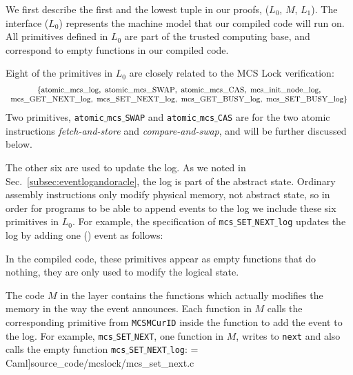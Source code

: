 We first describe the first and the lowest tuple in our proofs, ($L_0$, $M$, $L_1$).
The interface ($L_0$) represents the machine model that our compiled code will run on.
All primitives defined in $L_0$ are part of the trusted computing base, and correspond to empty functions in our compiled code.

Eight of the primitives in $L_0$  are closely related to the MCS Lock verification:
$$
\begin{small}
\begin{array}{c}
\{\mathrm{atomic\_mcs\_log},\ \mathrm{atomic\_mcs\_SWAP},\ \mathrm{atomic\_mcs\_CAS},\ \mathrm{mcs\_init\_node\_log},\\
\mathrm{mcs\_GET\_NEXT\_log},\ \mathrm{mcs\_SET\_NEXT\_log},\ \mathrm{mcs\_GET\_BUSY\_log},\ \mathrm{mcs\_SET\_BUSY\_log}\} \\
\end{array}
\end{small}
$$
Two primitives, \texttt{atomic$\_$mcs$\_$SWAP} and \texttt{atomic$\_$mcs$\_$CAS} are for the two atomic instructions {\em fetch-and-store} and {\em compare-and-swap}, and will be further discussed below.

The other six are used to update the log.  As we noted in
Sec.~\ref{subsec:eventlogandoracle}, the log is part of the abstract
state. Ordinary assembly instructions only modify physical memory, not
abstract state, so in order for programs to be able to append events to
the log we include these six primitives in $L_0$. 
For example, the specification of \texttt{mcs$\_$SET$\_$NEXT$\_$log} updates the log by adding one () event as follows:
 
In the compiled code, these primitives appear as empty functions that do nothing, they are only used to modify the logical state.


The code $M$ in the layer contains the 
functions which actually modifies the memory in the way the event announces.
Each function in $M$ calls the corresponding primitive from
\texttt{MCSMCurID} inside the function to add the event to the log.
For example, \texttt{mcs$\_$SET$\_$NEXT}, one function in $M$, writes
to \texttt{next} and also calls
the empty function \texttt{mcs$\_$SET$\_$NEXT$\_$log}:
 = Caml]{source_code/mcslock/mcs_set_next.c}

